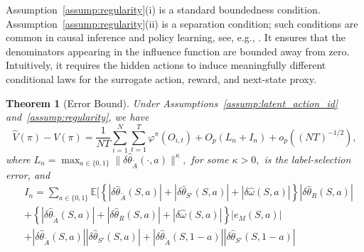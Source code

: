 \documentclass[12pt]{article}
\newcommand{\0}{\boldsymbol{0}}
\newtheorem{theorem}{Theorem}
\newcommand{\E}{\mathbb{E}}
\begin{document}
Assumption~\ref{assump:regularity}(i) is a standard boundedness condition. Assumption~\ref{assump:regularity}(ii) is a separation condition; such conditions are common in causal inference and policy learning, see, e.g., \citet{qian2011performance,zhou2024causal}. It ensures that the denominators appearing in the influence function are bounded away from zero. Intuitively, it requires the hidden actions to induce meaningfully different conditional laws for the surrogate action, reward, and next-state proxy.

\begin{theorem}[Error Bound]\label{thm:error}
Under Assumptions~\ref{assump:latent_action_id} and~\ref{assump:regularity}, we have
\[
\widehat V(\pi)-V(\pi) = \frac{1}{NT} \sum_{i=1}^N\sum_{t=1}^T\varphi^\pi(O_{i,t})+O_p(L_n+I_n) + o_p((NT)^{-1/2}),
\]where $L_n=\max_{a\in\{0,1\}}\|\delta \widehat \theta_{\widetilde A}(\cdot,a)\|^\kappa,$ for some $\kappa>0,$ is the label-selection error, and
\begin{align*}
&I_n = \sum_{a\in\{0,1\}}\E\Big[
\left\{|\delta\widehat\theta_{\widetilde A}(S,a)|
+|\delta\widehat\theta_{S'}(S,a)|
+|\delta\widehat\omega(S,a)|\right\}
|\delta\widehat\theta_R(S,a)| \\
&+ \left\{|\delta\widehat\theta_{\widetilde A}(S,a)|
+|\delta\widehat\theta_R(S,a)|
+|\delta\widehat\omega(S,a)|
\right\}|e_M(S,a)| \\
&+ |\delta\widehat\theta_{\widetilde A}(S,a)|
|\delta\widehat\theta_{S'}(S,a)| + 
|\delta\widehat\theta_{\widetilde A}(S,1-a)|
|\delta\widehat\theta_{S'}(S,1-a)|

\end{align*}
\end{theorem}
\end{document}
